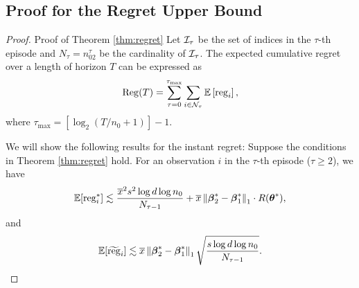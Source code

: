 \subsection{Proof for the Regret Upper Bound}
\label{sec:proof-upper}
\begin{proof}{Proof of Theorem \ref{thm:regret}}
Let ${\cal I}_{\tau}$ be the set of indices in the $\tau$-th episode and $N_{\tau}=n_02^{\tau}$ be the cardinality of ${\cal I}_{\tau}$. 
The expected cumulative regret over a length of horizon $T$ can be expressed as
\begin{equation*}
\operatorname{Reg}(T) = \sum_{\tau = 0}^{\tau_{\max}} \sum_{i\in{\cal N}_{\tau}} \mathbb{E}\left[ \operatorname{reg}_i \right],
\end{equation*}
where $\tau_{\max}=[\log_2(T/n_0+1)]-1$.

We will show the following results for the instant regret:
Suppose the conditions in Theorem \ref{thm:regret} hold. For an observation $i$ in the $\tau$-th episode ($\tau \geq 2$), we have
\begin{equation} \label{eqn:E[reg_i]-strong}
\mathbb{E}[\operatorname{reg}_i^{*}] \lesssim   \frac{\overline{x}^2s^2\log d \log n_0}{N_{\tau-1}} + \overline{x} \left\lVert\boldsymbol{\beta}_2^* - \boldsymbol{\beta}_1^*\right\rVert_1\cdot R(\boldsymbol{\theta}^*), 
\end{equation}
and
\begin{equation} \label{eqn:E[reg_i]-weak}
\mathbb{E}[\widetilde{\operatorname{reg}}_i] \lesssim \overline{x} \left\lVert\boldsymbol{\beta}_2^*-\boldsymbol{\beta}_1^*\right\rVert_1\sqrt{\frac{s\log d \log n_0}{N_{\tau-1}}}. 
\end{equation}
	

\end{proof}
